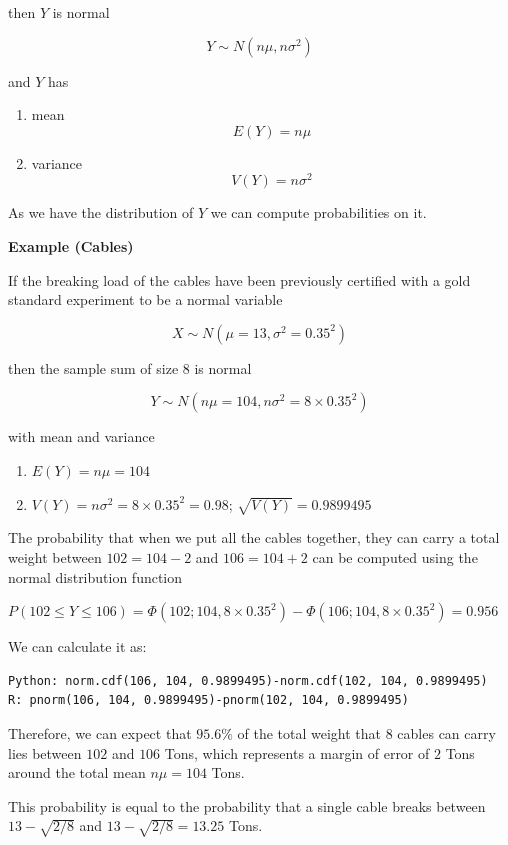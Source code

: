 \documentclass[
]{book}
\providecommand{\tightlist}{%
  \setlength{\itemsep}{0pt}\setlength{\parskip}{0pt}}
\begin{document}
then \(Y\) is normal

\[Y \sim N(n\mu, n\sigma^2)\]

and \(Y\) has

\begin{enumerate}
\def\labelenumi{\arabic{enumi})}
\tightlist
\item
  mean \[E(Y)=n\mu\]
\item
  variance \[V(Y)=n\sigma^2\]
\end{enumerate}

As we have the distribution of \(Y\) we can compute probabilities on it.

\textbf{Example (Cables)}

If the breaking load of the cables have been previously certified with a gold standard experiment to be a normal variable

\[X \sim N(\mu=13, \sigma^2=0.35^2)\]

then the sample sum of size \(8\) is normal

\[Y \sim N(n\mu=104, n\sigma^2=8\times 0.35^2)\]

with mean and variance

\begin{enumerate}
\def\labelenumi{\arabic{enumi})}
\tightlist
\item
  \(E(Y)=n\mu=104\)
\item
  \(V(Y)=n\sigma^2=8\times 0.35^2=0.98\); \(\sqrt{V(Y)}=0.9899495\)
\end{enumerate}

The probability that when we put all the cables together, they can carry a total weight between \(102=104-2\) and \(106=104+2\) can be computed using the normal distribution function

\(P(102 \leq Y \leq 106)=\Phi(102; 104, 8\times 0.35^2)-\Phi(106; 104, 8\times 0.35^2)=0.956\)

We can calculate it as:

\begin{verbatim}
Python: norm.cdf(106, 104, 0.9899495)-norm.cdf(102, 104, 0.9899495)
R: pnorm(106, 104, 0.9899495)-pnorm(102, 104, 0.9899495)
\end{verbatim}

Therefore, we can expect that \(95.6\%\) of the total weight that 8 cables can carry lies between \(102\) and \(106\) Tons, which represents a margin of error of \(2\) Tons around the total mean \(n\mu = 104\) Tons.

This probability is equal to the probability that a single cable breaks between \(13-\sqrt{2/8}\) and \(13-\sqrt{2/8}=13.25\) Tons.
\end{document}
